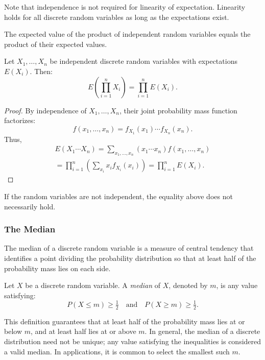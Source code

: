 Note that independence is not required for linearity of expectation. Linearity holds for all discrete random variables as long as the expectations exist.

The expected value of the product of independent random variables equals the product of their expected values.

\begin{proposition}
Let $X_{1}, \ldots, X_{n}$ be independent discrete random variables with expectations $E(X_{i})$. Then:
\[
E\left(\prod_{i=1}^{n} X_{i}\right) = \prod_{i=1}^{n} E(X_{i}).
\]
\end{proposition}
\begin{proof}
By independence of $X_{1}, \ldots, X_{n}$, their joint probability mass function factorizes:
\[
f(x_{1}, \ldots, x_{n}) = f_{X_{1}}(x_{1}) \cdots f_{X_{n}}(x_{n}).
\]
Thus,
\begin{equation*}
\begin{split}
E(X_{1} \cdots X_{n}) = \sum_{x_{1}, \ldots, x_{n}} (x_{1} \cdots x_{n}) f(x_{1}, \ldots, x_{n}) \\
= \prod_{i=1}^{n} \left(\sum_{x_{i}} x_{i} f_{X_{i}}(x_{i})\right)
= \prod_{i=1}^{n} E(X_{i}).
\end{split}
\end{equation*}
\end{proof}

If the random variables are not independent, the equality above does not necessarily hold.


\subsubsection*{The Median}

The median of a discrete random variable is a measure of central tendency that identifies a point dividing the probability distribution so that at least half of the probability mass lies on each side.

\begin{definition}
Let $X$ be a discrete random variable. A \emph{median} of $X$, denoted by $m$, is any value satisfying:
\[
P(X \leq m) \geq \tfrac{1}{2} \quad \text{and} \quad P(X \geq m) \geq \tfrac{1}{2}.
\]
\end{definition}

This definition guarantees that at least half of the probability mass lies at or below $m$, and at least half lies at or above $m$. In general, the median of a discrete distribution need not be unique; any value satisfying the inequalities is considered a valid median. In applications, it is common to select the smallest such $m$.

